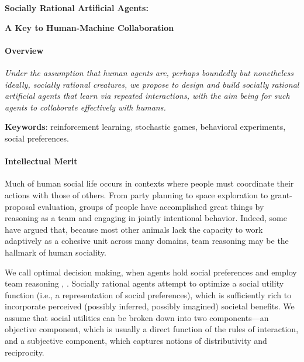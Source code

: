 
\centerline{\Large \bf Socially Rational Artificial Agents:}

\vspace{\down}
\centerline{\large \bf A Key to Human-Machine Collaboration}

\vspace{\up}
\paragraph{Overview}

\emph{Under the assumption that human agents are, perhaps boundedly
  but nonetheless ideally, socially rational creatures, we propose to
  design and build socially rational artificial agents that learn via
  repeated interactions, with the aim being for such agents to
  collaborate effectively with humans.}



{\bf Keywords}: reinforcement learning, stochastic games, behavioral experiments, social preferences.

\vspace{\up}
\paragraph{Intellectual Merit}

Much of human social life occurs in contexts where people must
coordinate their actions with those of others.  From party planning to
space exploration to grant-proposal evaluation, groups of people have
accomplished great things by reasoning as a team and engaging in
jointly intentional behavior.  Indeed, some have argued that, because
most other animals lack the capacity to work adaptively as a cohesive
unit across many domains, team reasoning may be the hallmark of human
sociality.

We call optimal decision making, when agents hold social preferences
and employ team reasoning , .  Socially
rational agents attempt to optimize a social utility function (i.e., a
representation of social preferences), which is sufficiently rich to
incorporate perceived (possibly inferred, possibly imagined) societal
benefits.  We assume that social utilities can be broken down into two
components---an objective component, which is usually a direct
function of the rules of interaction, and a subjective component,
which captures notions of distributivity and reciprocity.

